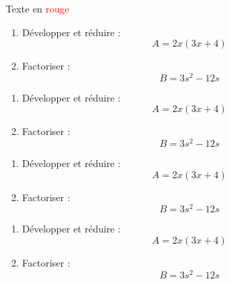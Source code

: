 \documentclass[10pt,a5paper]{article}
\begin{document}
\begin{Maquette}[FdR]{}

\begin{center}
    \AfficheFdR
\end{center}

\begin{exercice}[Source=Mme Lyonnais, Route]
Texte en \textcolor{red}{rouge}
\end{exercice}
\begin{exercice}[Source=Mme Lyonnais]
\begin{enumerate}
    \item{} Développer et réduire :
    \[A=2x(3x+4)\]
    \item{} Factoriser :
    \[B=3s^2-12s\]
\end{enumerate}
\end{exercice}
\begin{exercice}[Source=Mme Lyonnais, Route]
\begin{enumerate}
    \item{} Développer et réduire :
    \[A=2x(3x+4)\]
    \item{} Factoriser :
    \[B=3s^2-12s\]
\end{enumerate}
\end{exercice}
\begin{exercice}[Source=Mme Lyonnais, Route, Stop]
\begin{enumerate}
    \item{} Développer et réduire :
    \[A=2x(3x+4)\]
    \item{} Factoriser :
    \[B=3s^2-12s\]
\end{enumerate}
\end{exercice}
\begin{exercice}[Source=Mme Lyonnais, Route]
\begin{enumerate}
    \item{} Développer et réduire :
    \[A=2x(3x+4)\]
    \item{} Factoriser :
    \[B=3s^2-12s\]
\end{enumerate}
\end{exercice}
\end{Maquette}
\end{document}
